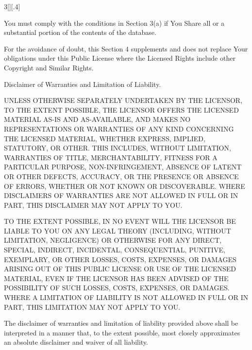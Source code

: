 \documentclass[8pt,a4paper]{article}
\begin{document}
\begin{multicols}{3}[][.4\paperwidth]
\begin{longenum}
\begin{longenum}
  \item You must comply with the conditions in Section 3(a) if You Share
     all or a substantial portion of the contents of the database.

  \end{longenum}

 For the avoidance of doubt, this Section 4 supplements and does not
 replace Your obligations under this Public License where the Licensed
 Rights include other Copyright and Similar Rights.


 \item Disclaimer of Warranties and Limitation of Liability.

  \begin{longenum}

  \item UNLESS OTHERWISE SEPARATELY UNDERTAKEN BY THE LICENSOR, TO THE
     EXTENT POSSIBLE, THE LICENSOR OFFERS THE LICENSED MATERIAL AS-IS
     AND AS-AVAILABLE, AND MAKES NO REPRESENTATIONS OR WARRANTIES OF
     ANY KIND CONCERNING THE LICENSED MATERIAL, WHETHER EXPRESS,
     IMPLIED, STATUTORY, OR OTHER. THIS INCLUDES, WITHOUT LIMITATION,
     WARRANTIES OF TITLE, MERCHANTABILITY, FITNESS FOR A PARTICULAR
     PURPOSE, NON-INFRINGEMENT, ABSENCE OF LATENT OR OTHER DEFECTS,
     ACCURACY, OR THE PRESENCE OR ABSENCE OF ERRORS, WHETHER OR NOT
     KNOWN OR DISCOVERABLE. WHERE DISCLAIMERS OF WARRANTIES ARE NOT
     ALLOWED IN FULL OR IN PART, THIS DISCLAIMER MAY NOT APPLY TO YOU.

  \item TO THE EXTENT POSSIBLE, IN NO EVENT WILL THE LICENSOR BE LIABLE
     TO YOU ON ANY LEGAL THEORY (INCLUDING, WITHOUT LIMITATION,
     NEGLIGENCE) OR OTHERWISE FOR ANY DIRECT, SPECIAL, INDIRECT,
     INCIDENTAL, CONSEQUENTIAL, PUNITIVE, EXEMPLARY, OR OTHER LOSSES,
     COSTS, EXPENSES, OR DAMAGES ARISING OUT OF THIS PUBLIC LICENSE OR
     USE OF THE LICENSED MATERIAL, EVEN IF THE LICENSOR HAS BEEN
     ADVISED OF THE POSSIBILITY OF SUCH LOSSES, COSTS, EXPENSES, OR
     DAMAGES. WHERE A LIMITATION OF LIABILITY IS NOT ALLOWED IN FULL OR
     IN PART, THIS LIMITATION MAY NOT APPLY TO YOU.

  \item The disclaimer of warranties and limitation of liability provided
     above shall be interpreted in a manner that, to the extent
     possible, most closely approximates an absolute disclaimer and
     waiver of all liability.


\end{longenum}
\end{longenum}
\end{multicols}
\end{document}
